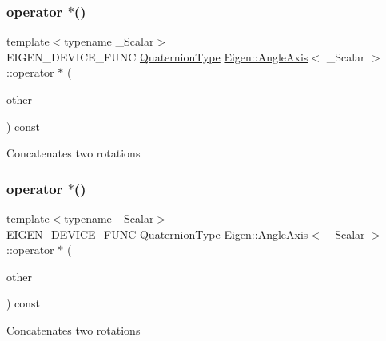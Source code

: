 \subsubsection{\texorpdfstring{operator $\ast$()}{operator *()}\hspace{0.1cm}{\footnotesize\ttfamily [1/2]}}
{\footnotesize\ttfamily template$<$typename \+\_\+\+Scalar$>$ \\
E\+I\+G\+E\+N\+\_\+\+D\+E\+V\+I\+C\+E\+\_\+\+F\+U\+NC \mbox{\hyperlink{class_eigen_1_1_quaternion}{Quaternion\+Type}} \mbox{\hyperlink{class_eigen_1_1_angle_axis}{Eigen\+::\+Angle\+Axis}}$<$ \+\_\+\+Scalar $>$\+::operator $\ast$ (\begin{DoxyParamCaption}\item[{const \mbox{\hyperlink{class_eigen_1_1_angle_axis}{Angle\+Axis}}$<$ \+\_\+\+Scalar $>$ \&}]{other }\end{DoxyParamCaption}) const\hspace{0.3cm}{\ttfamily [inline]}}

Concatenates two rotations \mbox{\label{class_eigen_1_1_angle_axis_a44daf2b0465ad2a69cf6c6aa40354be2}} 
\subsubsection{\texorpdfstring{operator $\ast$()}{operator *()}\hspace{0.1cm}{\footnotesize\ttfamily [2/2]}}
{\footnotesize\ttfamily template$<$typename \+\_\+\+Scalar$>$ \\
E\+I\+G\+E\+N\+\_\+\+D\+E\+V\+I\+C\+E\+\_\+\+F\+U\+NC \mbox{\hyperlink{class_eigen_1_1_quaternion}{Quaternion\+Type}} \mbox{\hyperlink{class_eigen_1_1_angle_axis}{Eigen\+::\+Angle\+Axis}}$<$ \+\_\+\+Scalar $>$\+::operator $\ast$ (\begin{DoxyParamCaption}\item[{const \mbox{\hyperlink{class_eigen_1_1_quaternion}{Quaternion\+Type}} \&}]{other }\end{DoxyParamCaption}) const\hspace{0.3cm}{\ttfamily [inline]}}

Concatenates two rotations \mbox{\label{class_eigen_1_1_angle_axis_aff838a6d260ae70bd7b8ff452dfbdfb6}} 
